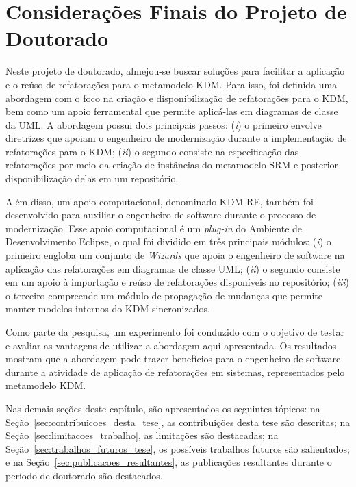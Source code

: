 \section{Considerações Finais do Projeto de Doutorado}
Neste projeto de doutorado, almejou-se buscar soluções para facilitar a aplicação e o reúso de refatorações para o metamodelo KDM. Para isso, foi definida uma abordagem com o foco na criação e disponibilização de refatorações para o KDM, bem como um apoio ferramental que permite aplicá-las em diagramas de classe da UML. A abordagem possui dois principais passos: (\textit{i}) o primeiro envolve diretrizes que apoiam o engenheiro de modernização durante a implementação de refatorações para o KDM; (\textit{ii}) o segundo consiste na especificação das refatorações por meio da criação de instâncias do metamodelo SRM e posterior disponibilização delas em um repositório.

Além disso, um apoio computacional, denominado KDM-RE, também foi desenvolvido para auxiliar o engenheiro de software durante o processo de modernização. Esse apoio computacional é um \textit{plug-in} do Ambiente de Desenvolvimento Eclipse, o qual foi dividido em três principais módulos: (\textit{i}) o primeiro engloba um conjunto de \textit{Wizards} que apoia o engenheiro de software na aplicação das refatorações em diagramas de classe UML; (\textit{ii}) o segundo consiste em um apoio à importação e reúso de refatorações disponíveis no repositório; (\textit{iii}) o terceiro compreende um módulo de propagação de mudanças que permite manter modelos internos do KDM sincronizados.

Como parte da pesquisa, um experimento foi conduzido com o objetivo de testar e avaliar as vantagens de utilizar a abordagem aqui apresentada. Os resultados mostram que a abordagem pode trazer benefícios para o engenheiro de software durante a atividade de aplicação de refatorações em sistemas, representados pelo metamodelo KDM.


Nas demais seções deste capítulo, são apresentados os seguintes tópicos: na Seção~\ref{sec:contribuicoes_desta_tese}, as contribuições desta tese são descritas; na Seção~\ref{sec:limitacoes_trabalho}, as limitações são destacadas; na Seção~\ref{sec:trabalhos_futuros_tese}, os possíveis trabalhos futuros são salientados; e na Seção~\ref{sec:publicacoes_resultantes}, as publicações resultantes durante o período de doutorado são destacados. 

